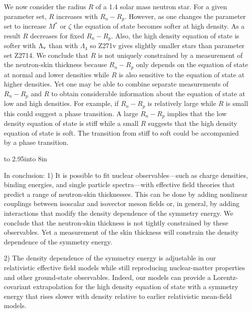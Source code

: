 We now consider the radius $R$ of a 1.4 solar mass neutron star.  For a
given parameter set, $R$ increases with $R_n\!-\!R_p$.  However, as one
changes the parameter set to increase $M^*$ or $\zeta$ the equation of
state becomes softer at high density.  As a result $R$ decreases for
fixed $R_n\!-\!R_p$.  Also, the high density equation of state is
softer with $\Lambda_{\rm v}$ than with $\Lambda_4$ so Z271v gives
slightly smaller stars than parameter set Z2714.  We conclude that $R$
is not uniquely constrained by a measurement of the neutron-skin
thickness because $R_n\!-\!R_p$ only depends on the equation of state
at normal and lower densities while $R$ is also sensitive to the
equation of state at higher densities. Yet one may be able to combine
separate measurements of $R_n\!-\!R_p$ and $R$ to obtain considerable
information about the equation of state at low and high densities.
For example, if $R_n\!-\!R_p$ is relatively large while $R$ is small
this could suggest a phase transition.  A large $R_n\!-\!R_p$ implies
that the low density equation of state is stiff while a small $R$
suggests that the high density equation of state is soft.  The
transition from stiff to soft could be accompanied by a phase
transition.


\vbox to 2.95in{\vss\hbox to 8in{\hss}}
\vskip 10pt

In conclusion:
1) It is possible to fit nuclear observables---such as
charge densities, binding energies, and single particle 
spectra---with effective field theories that predict a
range of neutron-skin thicknesses. This can be done by adding 
nonlinear couplings between isoscalar and isovector meson fields 
or, in general, by adding interactions that modify the density 
dependence of the symmetry energy. We conclude that the neutron-skin 
thickness is not tightly constrained by these observables. Yet a 
measurement of the skin thickness will constrain the density 
dependence of the symmetry energy.

2) The density dependence of the symmetry energy is adjustable 
in our relativistic effective field models while still reproducing 
nuclear-matter properties and other ground-state observables. Indeed,
our models can provide a Lorentz-covariant extrapolation for the high 
density equation of state with a symmetry energy that rises slower 
with density relative to earlier relativistic mean-field models.

